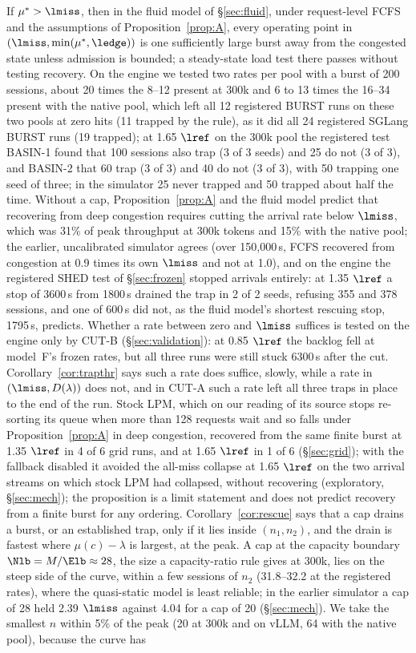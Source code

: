 If $\mu^*>\lmiss$, then in the fluid model of \S\ref{sec:fluid}, under request-level FCFS and the assumptions of Proposition~\ref{prop:A}, every operating point in $(\lmiss,\min(\mu^*,\ledge))$ is one sufficiently large burst away from the congested state unless admission is bounded; a steady-state load test there passes without testing recovery. On the engine we tested two rates per pool with a burst of 200 sessions, about 20 times the 8--12 present at 300k and 6 to 13 times the 16--34 present with the native pool, which left all 12 registered BURST runs on these two pools at zero hits (11 trapped by the rule), as it did all 24 registered SGLang BURST runs (19 trapped); at 1.65 $\lref$ on the 300k pool the registered test BASIN-1 found that 100 sessions also trap (3 of 3 seeds) and 25 do not (3 of 3), and BASIN-2 that 60 trap (3 of 3) and 40 do not (3 of 3), with 50 trapping one seed of three; in the simulator 25 never trapped and 50 trapped about half the time. Without a cap, Proposition~\ref{prop:A} and the fluid model predict that recovering from deep congestion requires cutting the arrival rate below $\lmiss$, which was 31\% of peak throughput at 300k tokens and 15\% with the native pool; the earlier, uncalibrated simulator agrees (over 150,000\,s, FCFS recovered from congestion at 0.9 times its own $\lmiss$ and not at 1.0), and on the engine the registered SHED test of \S\ref{sec:frozen} stopped arrivals entirely: at 1.35 $\lref$ a stop of 3600\,s from 1800\,s drained the trap in 2 of 2 seeds, refusing 355 and 378 sessions, and one of 600\,s did not, as the fluid model's shortest rescuing stop, 1795\,s, predicts. Whether a rate between zero and $\lmiss$ suffices is tested on the engine only by CUT-B (\S\ref{sec:validation}): at 0.85 $\lref$ the backlog fell at model~F's frozen rates, but all three runs were still stuck 6300\,s after the cut. Corollary~\ref{cor:trapthr} says such a rate does suffice, slowly, while a rate in $(\lmiss,D(\lambda))$ does not, and in CUT-A such a rate left all three traps in place to the end of the run. Stock LPM, which on our reading of its source stops re-sorting its queue when more than 128 requests wait and so falls under Proposition~\ref{prop:A} in deep congestion, recovered from the same finite burst at 1.35 $\lref$ in 4 of 6 grid runs, and at 1.65 $\lref$ in 1 of 6 (\S\ref{sec:grid}); with the fallback disabled it avoided the all-miss collapse at 1.65 $\lref$ on the two arrival streams on which stock LPM had collapsed, without recovering (exploratory, \S\ref{sec:mech}); the proposition is a limit statement and does not predict recovery from a finite burst for any ordering. Corollary~\ref{cor:rescue} says that a cap drains a burst, or an established trap, only if it lies inside $(n_1,n_2)$, and the drain is fastest where $\mu(c)-\lambda$ is largest, at the peak. A cap at the capacity boundary $\Nlb=M/\Elb\approx28$, the size a capacity-ratio rule gives at 300k, lies on the steep side of the curve, within a few sessions of $n_2$ (31.8--32.2 at the registered rates), where the quasi-static model is least reliable; in the earlier simulator a cap of 28 held 2.39 $\lmiss$ against 4.04 for a cap of 20 (\S\ref{sec:mech}). We take the smallest $n$ within 5\% of the peak (20 at 300k and on vLLM, 64 with the native pool), because the curve has 